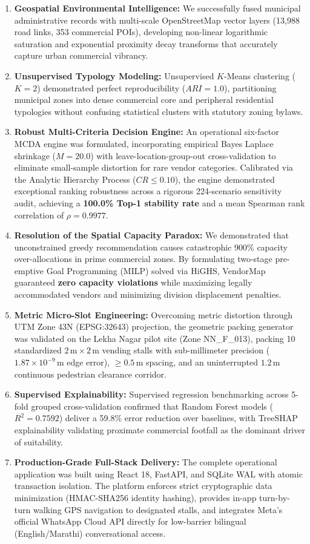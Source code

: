 \begin{enumerate}
    \item \textbf{Geospatial Environmental Intelligence:} We successfully fused municipal administrative records with multi-scale OpenStreetMap vector layers (13,988 road links, 353 commercial POIs), developing non-linear logarithmic saturation and exponential proximity decay transforms that accurately capture urban commercial vibrancy.
    \item \textbf{Unsupervised Typology Modeling:} Unsupervised $K$-Means clustering ($K=2$) demonstrated perfect reproducibility ($ARI = 1.0$), partitioning municipal zones into dense commercial core and peripheral residential typologies without confusing statistical clusters with statutory zoning bylaws.
    \item \textbf{Robust Multi-Criteria Decision Engine:} An operational six-factor MCDA engine was formulated, incorporating empirical Bayes Laplace shrinkage ($M=20.0$) with leave-location-group-out cross-validation to eliminate small-sample distortion for rare vendor categories. Calibrated via the Analytic Hierarchy Process ($CR \le 0.10$), the engine demonstrated exceptional ranking robustness across a rigorous 224-scenario sensitivity audit, achieving a \textbf{100.0\% Top-1 stability rate} and a mean Spearman rank correlation of $\rho = 0.9977$.
    \item \textbf{Resolution of the Spatial Capacity Paradox:} We demonstrated that unconstrained greedy recommendation causes catastrophic 900\% capacity over-allocations in prime commercial zones. By formulating two-stage pre-emptive Goal Programming (MILP) solved via HiGHS, VendorMap guaranteed \textbf{zero capacity violations} while maximizing legally accommodated vendors and minimizing division displacement penalties.
    \item \textbf{Metric Micro-Slot Engineering:} Overcoming metric distortion through UTM Zone 43N (EPSG:32643) projection, the geometric packing generator was validated on the Lekha Nagar pilot site (Zone NN\_F\_013), packing 10 standardized $2\,\text{m} \times 2\,\text{m}$ vending stalls with sub-millimeter precision ($1.87 \times 10^{-9}\,\text{m}$ edge error), $\ge 0.5\,\text{m}$ spacing, and an uninterrupted $1.2\,\text{m}$ continuous pedestrian clearance corridor.
    \item \textbf{Supervised Explainability:} Supervised regression benchmarking across 5-fold grouped cross-validation confirmed that Random Forest models ($R^2 = 0.7592$) deliver a 59.8\% error reduction over baselines, with TreeSHAP explainability validating proximate commercial footfall as the dominant driver of suitability.
    \item \textbf{Production-Grade Full-Stack Delivery:} The complete operational application was built using React 18, FastAPI, and SQLite WAL with atomic transaction isolation. The platform enforces strict cryptographic data minimization (HMAC-SHA256 identity hashing), provides in-app turn-by-turn walking GPS navigation to designated stalls, and integrates Meta's official WhatsApp Cloud API directly for low-barrier bilingual (English/Marathi) conversational access.
\end{enumerate}

